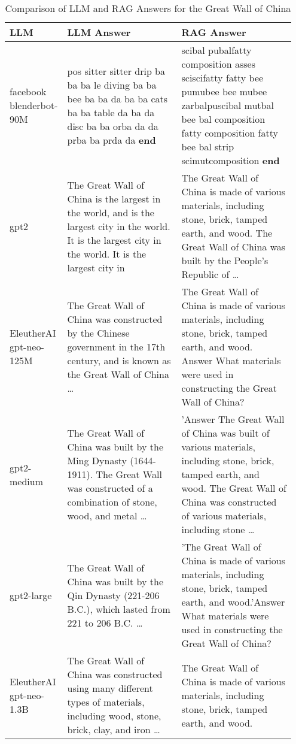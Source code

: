 \documentclass{wseas}
\begin{document}
\begin{table*}[htbp]
\centering
\begin{tabular}{|p{0.15\linewidth}|p{0.4\linewidth}|p{0.4\linewidth}|}
\hline
\textbf{LLM} & \textbf{LLM Answer} & \textbf{RAG Answer} \\ \hline
facebook blenderbot-90M & pos sitter sitter drip ba ba ba le diving ba ba bee ba ba da ba ba cats ba ba table da ba da disc ba ba orba da da prba ba prda da \textbf{end} & scibal pubalfatty composition asses sciscifatty fatty bee pumubee bee mubee zarbalpuscibal mutbal bee bal composition fatty composition fatty bee bal strip scimutcomposition \textbf{end} \\ \hline
gpt2 & The Great Wall of China is the largest in the world, and is the largest city in the world. It is the largest city in the world. It is the largest city in & The Great Wall of China is made of various materials, including stone, brick, tamped earth, and wood. The Great Wall of China was built by the People's Republic of \ldots{} \\ \hline
EleutherAI gpt-neo-125M & The Great Wall of China was constructed by the Chinese government in the 17th century, and is known as the Great Wall of China \ldots{} & The Great Wall of China is made of various materials, including stone, brick, tamped earth, and wood. Answer What materials were used in constructing the Great Wall of China? \\ \hline
gpt2-medium & The Great Wall of China was built by the Ming Dynasty (1644-1911). The Great Wall was constructed of a combination of stone, wood, and metal \ldots{} & 'Answer The Great Wall of China was built of various materials, including stone, brick, tamped earth, and wood. The Great Wall of China was constructed of various materials, including stone \ldots{} \\ \hline
gpt2-large & The Great Wall of China was built by the Qin Dynasty (221-206 B.C.), which lasted from 221 to 206 B.C. \ldots{} & 'The Great Wall of China is made of various materials, including stone, brick, tamped earth, and wood.'Answer What materials were used in constructing the Great Wall of China? \\ \hline
EleutherAI gpt-neo-1.3B & The Great Wall of China was constructed using many different types of materials, including wood, stone, brick, clay, and iron \ldots{} & The Great Wall of China is made of various materials, including stone, brick, tamped earth, and wood. \\ \hline
\end{tabular}
\caption{Comparison of LLM and RAG Answers for the Great Wall of China}
\end{table*}
\end{document}
